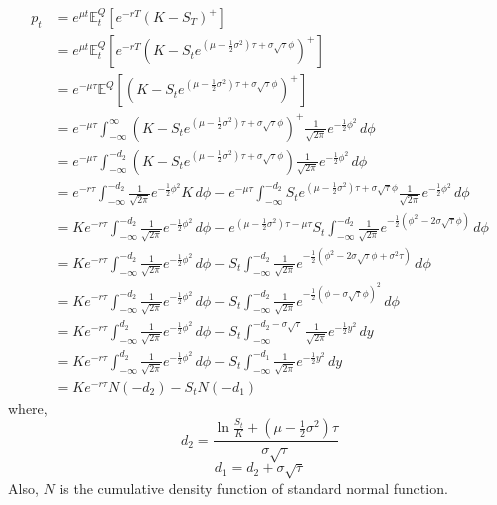 \begin{equation}
\begin{split}
p_{t} 
&= e^{\mu t}\mathbb{E}_{t}^{Q}[e^{-rT}(K - S_{T})^{+}]\\
&= e^{\mu t}\mathbb{E}_{t}^{Q}[e^{-rT}(K - S_{t}e^{(\mu - \frac{1}{2}\sigma^{2})\tau + \sigma\sqrt{\tau}\phi})^{+}]\\
&= e^{-\mu \tau}\mathbb{E}^{Q}[(K - S_{t}e^{(\mu - \frac{1}{2}\sigma^{2})\tau + \sigma\sqrt{\tau}\phi})^{+}]\\
&= e^{-\mu \tau}\int_{-\infty}^{\infty} (K - S_{t}e^{(\mu - \frac{1}{2}\sigma^{2})\tau + \sigma\sqrt{\tau}\phi})^{+}\frac{1}{\sqrt{2\pi}}e^{-\frac{1}{2}\phi^{2}}  \, d\phi \\
&= e^{-\mu \tau}\int_{-\infty}^{-d_{2}} (K - S_{t}e^{(\mu - \frac{1}{2}\sigma^{2})\tau + \sigma\sqrt{\tau}\phi})\frac{1}{\sqrt{2\pi}}e^{-\frac{1}{2}\phi^{2}}  \, d\phi \\
&= e^{-r\tau}\int_{-\infty}^{-d_{2}} \frac{1}{\sqrt{2\pi}}e^{-\frac{1}{2}\phi^{2}}K\, d\phi -e^{-\mu \tau}\int_{-\infty}^{-d_{2}} S_{t}e^{(\mu - \frac{1}{2}\sigma^{2})\tau + \sigma\sqrt{\tau}\phi}\frac{1}{\sqrt{2\pi}}e^{-\frac{1}{2}\phi^{2}}  \, d\phi\\
&= Ke^{-r\tau}\int_{-\infty}^{-d_{2}} \frac{1}{\sqrt{2\pi}}e^{-\frac{1}{2}\phi^{2}}\, d\phi - e^{(\mu - \frac{1}{2}\sigma^{2})\tau-\mu \tau}S_{t}\int_{-\infty}^{-d_{2}} \frac{1}{\sqrt{2\pi}}e^{-\frac{1}{2}(\phi^{2}-2\sigma\sqrt{\tau}\phi)}  \, d\phi\\
&= Ke^{-r\tau}\int_{-\infty}^{-d_{2}} \frac{1}{\sqrt{2\pi}}e^{-\frac{1}{2}\phi^{2}}\, d\phi - S_{t}\int_{-\infty}^{-d_{2}} \frac{1}{\sqrt{2\pi}}e^{-\frac{1}{2}(\phi^{2}-2\sigma\sqrt{\tau}\phi+\sigma^{2}\tau)}  \, d\phi\\
&= Ke^{-r\tau}\int_{-\infty}^{-d_{2}} \frac{1}{\sqrt{2\pi}}e^{-\frac{1}{2}\phi^{2}}\, d\phi - S_{t}\int_{-\infty}^{-d_{2}} \frac{1}{\sqrt{2\pi}}e^{-\frac{1}{2}(\phi-\sigma\sqrt{\tau}\phi)^{2}}  \, d\phi\\
&= Ke^{-r\tau}\int_{-\infty}^{d_{2}} \frac{1}{\sqrt{2\pi}}e^{-\frac{1}{2}\phi^{2}}\, d\phi - S_{t}\int_{-\infty}^{-d_{2}-\sigma\sqrt{\tau}} \frac{1}{\sqrt{2\pi}}e^{-\frac{1}{2}y^{2}}  \, dy\\
&= Ke^{-r\tau}\int_{-\infty}^{d_{2}} \frac{1}{\sqrt{2\pi}}e^{-\frac{1}{2}\phi^{2}}\, d\phi - S_{t}\int_{-\infty}^{-d_{1}} \frac{1}{\sqrt{2\pi}}e^{-\frac{1}{2}y^{2}}  \, dy \\
&= Ke^{-r\tau} N(-d_{2}) - S_{t} N(-d_{1})
\end{split}
\end{equation}
where,
$$d_{2} = \frac{\ln{\frac{S_{t}}{K}} + (\mu - \frac{1}{2}\sigma^{2})\tau}{\sigma\sqrt{\tau}}$$
$$d_{1} = d_{2} + \sigma\sqrt{\tau}$$
Also, $N$ is the cumulative density function of standard normal function.
\newpage

